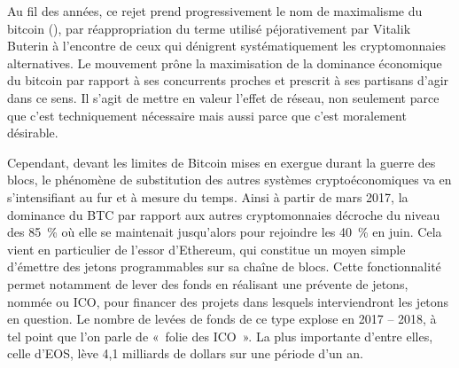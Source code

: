Au fil des années, ce rejet prend progressivement le nom de maximalisme du bitcoin (), par réappropriation du terme utilisé péjorativement par Vitalik Buterin à l'encontre de ceux qui dénigrent systématiquement les cryptomonnaies alternatives. Le mouvement prône la maximisation de la dominance économique du bitcoin par rapport à ses concurrents proches et prescrit à ses partisans d'agir dans ce sens. Il s'agit de mettre en valeur l'effet de réseau, non seulement parce que c'est techniquement nécessaire mais aussi parce que c'est moralement désirable.


Cependant, devant les limites de Bitcoin mises en exergue durant la guerre des blocs, le phénomène de substitution des autres systèmes cryptoéconomiques va en s'intensifiant au fur et à mesure du temps. Ainsi à partir de mars 2017, la dominance du BTC par rapport aux autres cryptomonnaies décroche du niveau des 85~\% où elle se maintenait jusqu'alors pour rejoindre les 40~\% en juin. Cela vient en particulier de l'essor d'Ethereum, qui constitue un moyen simple d'émettre des jetons programmables sur sa chaîne de blocs. Cette fonctionnalité permet notamment de lever des fonds en réalisant une prévente de jetons, nommée  ou ICO, pour financer des projets dans lesquels interviendront les jetons en question. Le nombre de levées de fonds de ce type explose en 2017 -- 2018, à tel point que l'on parle de «~folie des ICO~». La plus importante d'entre elles, celle d'EOS, lève 4,1 milliards de dollars sur une période d'un an.

